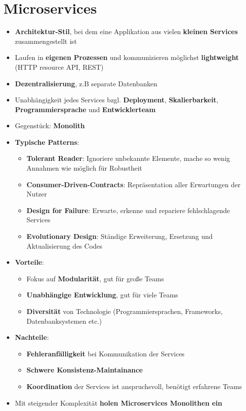 \section{Microservices}
\label{ms:sec:microservices}

\begin{itemize}
	\item \textbf{Architektur-Stil}, bei dem eine Applikation aus vielen \textbf{kleinen Services} zusammengestellt ist
	\item Laufen in \textbf{eigenen Prozessen} und kommunizieren möglichst \textbf{lightweight} (HTTP resource API, REST)
	\item \textbf{Dezentralisierung}, z.B separate Datenbanken
	\item Unabhängigkeit jedes Services bzgl. \textbf{Deployment}, \textbf{Skalierbarkeit}, \textbf{Programmiersprache} und \textbf{Entwicklerteam}
	\item Gegenstück: \textbf{Monolith}
	\item \textbf{Typische Patterns}:
	\begin{itemize}
		\item \textbf{Tolerant Reader}: Ignoriere unbekannte Elemente, mache so wenig Annahmen wie möglich für Robustheit
		\item \textbf{Consumer-Driven-Contracts}: Repräsentation aller Erwartungen der Nutzer
		\item \textbf{Design for Failure}: Erwarte, erkenne und repariere fehlschlagende Services
		\item \textbf{Evolutionary Design}: Ständige Erweiterung, Ersetzung und Aktualisierung des Codes
	\end{itemize}
	\item \textbf{Vorteile}:
	\begin{itemize}
		\item Fokus auf \textbf{Modularität}, gut für große Teams
		\item \textbf{Unabhängige Entwicklung}, gut für viele Teams
		\item \textbf{Diversität} von Technologie (Programmiersprachen, Frameworks, Datenbanksystemen etc.)
	\end{itemize}
	\item \textbf{Nachteile}:
	\begin{itemize}
		\item \textbf{Fehleranfälligkeit} bei Kommunikation der Services
		\item \textbf{Schwere Konsistenz-Maintainance}
		\item \textbf{Koordination} der Services ist anspruchsvoll, benötigt erfahrene Teams
	\end{itemize}
	\item Mit steigender Komplexität \textbf{holen Microservices Monolithen ein}
\end{itemize}